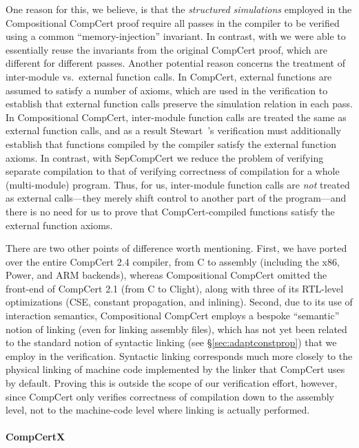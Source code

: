 One reason for this, we believe, is that the \emph{structured
  simulations} employed in the Compositional CompCert proof require
all passes in the compiler to be verified using a common
``memory-injection'' invariant.  In contrast, with \sepcomp{} we were
able to essentially reuse the invariants from the original CompCert
proof, which are different for different passes.  Another potential
reason concerns the treatment of inter-module vs.\ external function
calls.  In CompCert, external functions are assumed to satisfy a
number of axioms, which are used in the verification to establish that
external function calls preserve the simulation relation in each pass.
In Compositional CompCert, inter-module function calls are treated the
same as external function calls, and as a result Stewart~\etal's
verification must additionally establish that functions compiled by
the compiler satisfy the external function axioms.  In contrast, with
SepCompCert we reduce the problem of verifying separate compilation to
that of verifying correctness of compilation for a whole
(multi-module) program.  Thus, for us, inter-module function calls are
\emph{not} treated as external calls---they merely shift control to
another part of the program---and there is no need for us to prove
that CompCert-compiled functions satisfy the external function axioms.

There are two other points of difference worth mentioning.  First, we
have ported over the entire CompCert 2.4 compiler, from C to assembly
(including the x86, Power, and ARM backends), whereas Compositional
CompCert omitted the front-end of CompCert 2.1 (from C to Clight),
along with three of its RTL-level optimizations (CSE, constant
propagation, and inlining).  Second, due to its use of interaction
semantics, Compositional CompCert employs a bespoke ``semantic''
notion of linking (even for linking assembly files), which has not yet
been related to the standard notion of syntactic linking (see
\S\ref{sec:adaptconstprop}) that we employ in the \sepcomp{}
verification.  Syntactic linking corresponds much more closely to the
physical linking of machine code implemented by the  linker
that CompCert uses by default.  Proving this is outside the scope of
our verification effort, however, since CompCert only verifies
correctness of compilation down to the assembly level, not to the
machine-code level where linking is actually performed.

\paragraph{CompCertX}

